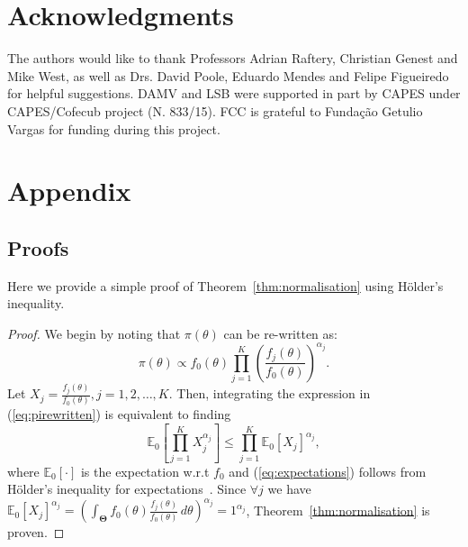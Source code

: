 \documentclass[a4paper, notitlepage, 11pt]{article}
\begin{document}
\section*{Acknowledgments}

The authors would like to thank Professors Adrian Raftery, Christian Genest and Mike West, as well as  Drs. David Poole, Eduardo Mendes and Felipe Figueiredo for helpful suggestions.
DAMV and LSB were supported in part by CAPES under CAPES/Cofecub project (N. 833/15).
FCC is grateful to Funda\c{c}\~ao Getulio Vargas for funding during this 
project.


\newpage 

\appendix
\section{Appendix}
\renewcommand\thefigure{S\arabic{figure}}    
\setcounter{figure}{0} 

\subsection{Proofs}
\label{sec:appendix_proofs}

Here we provide a simple proof of Theorem~\ref{thm:normalisation} using H\"{o}lder's inequality.
\begin{proof}
We begin by noting that $\pi(\theta)$ can be re-written as:
\begin{equation}
\label{eq:pirewritten}
 \pi(\theta) \propto f_0(\theta)\prod_{j=1}^{K} \left(\frac{f_j(\theta)}{f_0(\theta)}\right)^{\alpha_j}.
\end{equation}
Let $X_j = \frac{f_j(\theta)}{f_0(\theta)}, j=1, 2,\ldots, K$. 
Then, integrating the expression in (\ref{eq:pirewritten}) is equivalent to finding 
\begin{equation}
\label{eq:expectations}
\mathbb{E}_{0}\left[\prod_{j=1}^KX_j^{\alpha_j}\right] \leq \prod_{j=1}^K \mathbb{E}_{0}[X_j]^{\alpha_j},
\end{equation}
where $\mathbb{E}_{0}[\cdot]$ is the expectation w.r.t $f_0$ and (\ref{eq:expectations}) follows from H\"{o}lder's inequality for expectations~\citep{Yeh2011}.
Since $\forall j$ we have $\mathbb{E}_{0}[X_j]^{\alpha_j} = \left(\int_{\boldsymbol\Theta}f_0(\theta)\frac{f_j(\theta)}{f_0(\theta)}\, d\theta\right)^{\alpha_j}=1^{\alpha_j}$, Theorem~\ref{thm:normalisation} is proven.
\end{proof}
\end{document}
